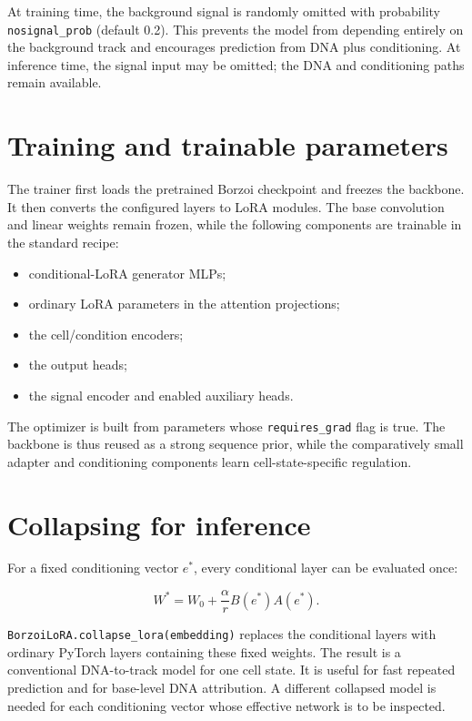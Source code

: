 \documentclass[11pt]{article}
\newcommand{\code}[1]{\texttt{\small #1}}
\newcommand{\Wbase}{W_{0}}
\newcommand{\condvec}{e}
\begin{document}
At training time, the background signal is randomly omitted with probability
\code{nosignal\_prob} (default 0.2). This prevents the model from depending entirely on the
background track and encourages prediction from DNA plus conditioning. At inference time,
the signal input may be omitted; the DNA and conditioning paths remain available.

\section{Training and trainable parameters}

The trainer first loads the pretrained Borzoi checkpoint and freezes the backbone. It then
converts the configured layers to LoRA modules. The base convolution and linear weights
remain frozen, while the following components are trainable in the standard recipe:

\begin{itemize}[leftmargin=2em]
  \item conditional-LoRA generator MLPs;
  \item ordinary LoRA parameters in the attention projections;
  \item the cell/condition encoders;
  \item the output heads;
  \item the signal encoder and enabled auxiliary heads.
\end{itemize}

The optimizer is built from parameters whose \code{requires\_grad} flag is true. The
backbone is thus reused as a strong sequence prior, while the comparatively small adapter
and conditioning components learn cell-state-specific regulation.

\section{Collapsing for inference}

For a fixed conditioning vector $\condvec^*$, every conditional layer can be evaluated once:

\[
W^* = \Wbase + \frac{\alpha}{r}B(\condvec^*)A(\condvec^*).
\]

\code{BorzoiLoRA.collapse\_lora(embedding)} replaces the conditional layers with ordinary
PyTorch layers containing these fixed weights. The result is a conventional DNA-to-track
model for one cell state. It is useful for fast repeated prediction and for base-level DNA
attribution. A different collapsed model is needed for each conditioning vector whose
effective network is to be inspected.
\end{document}
